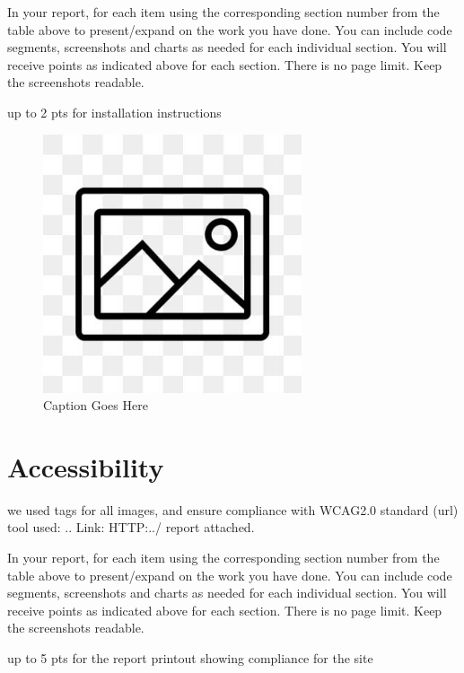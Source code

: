 \documentclass[12pt, letterpaper]{article}
\begin{document}
In your report, for each item using the corresponding section number from the table above to present/expand on the work you have done. You can include code segments, screenshots and charts as needed for each individual section. You will receive points as indicated above for each section. There is no page limit. Keep the screenshots readable.

up to 2 pts for installation instructions

\begin{figure}[htbp]
	\centering
	\includegraphics[width=3in]{images/placeholder.jpg}
	\caption{Caption Goes Here}
 \end{figure}

 \newpage

\section{Accessibility}
we used tags for all images, and ensure compliance with WCAG2.0 standard (url)  tool used: .. Link: HTTP:../ report attached.

In your report, for each item using the corresponding section number from the table above to present/expand on the work you have done. You can include code segments, screenshots and charts as needed for each individual section. You will receive points as indicated above for each section. There is no page limit. Keep the screenshots readable.

up to 5 pts for the report printout showing compliance for the site
\end{document}
